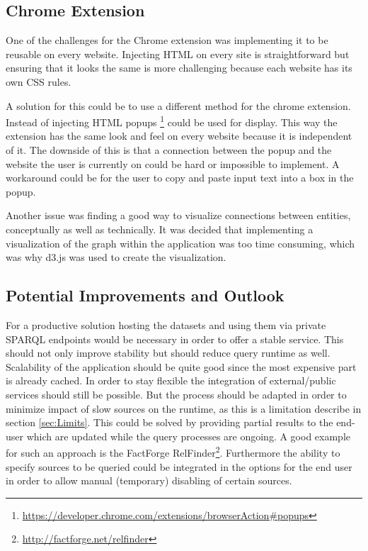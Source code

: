 \subsection{Chrome Extension}
One of the challenges for the Chrome extension was implementing it to be reusable on every website. Injecting HTML on every site is straightforward but ensuring that it looks the same is more challenging because each website has its own CSS rules.

A solution for this could be to use a different method for the chrome extension. Instead of injecting HTML popups \footnote{\url{https://developer.chrome.com/extensions/browserAction\#popups}} could be used for display. This way the extension has the same look and feel on every website because it is independent of it. The downside of this is that a connection between the popup and the website the user is currently on could be hard or impossible to implement. A workaround could be for the user to copy and paste input text into a box in the popup. 

Another issue was finding a good way to visualize connections between entities, conceptually as well as technically. It was decided that implementing a visualization of the graph within the application was too time consuming, which was why d3.js was used to create the visualization.




\subsection{Potential Improvements and Outlook}
For a productive solution hosting the datasets and using them via private SPARQL endpoints would be necessary in order to offer a stable service. This should not only improve stability but should reduce query runtime as well. Scalability of the application should be quite good since the most expensive part is already cached. 
In order to stay flexible the integration of external/public services should still be possible. But the process should be adapted in order to minimize impact of slow sources on the runtime, as this is a limitation describe in section \ref{sec:Limits}. This could be solved by providing partial results to the end-user which are updated while the query processes are ongoing. A good example for such an approach is the FactForge RelFinder\footnote{\url{http://factforge.net/relfinder}}. Furthermore the ability to specify sources to be queried could be integrated in the options for the end user in order to allow manual (temporary) disabling of certain sources. 

